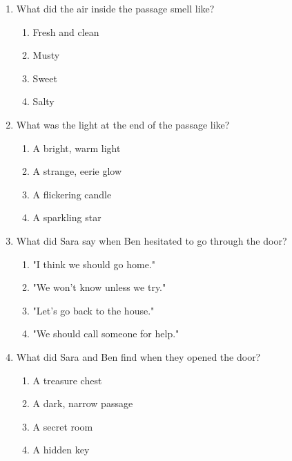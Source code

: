 \documentclass[12pt]{article}
\begin{document}
\begin{enumerate}
    \vspace{0.5cm}

    \item What did the air inside the passage smell like?
    \begin{enumerate}[label=\Alph*.]
        \item Fresh and clean
        \item Musty
        \item Sweet
        \item Salty
    \end{enumerate}

    \vspace{0.5cm}

    \item What was the light at the end of the passage like?
    \begin{enumerate}[label=\Alph*.]
        \item A bright, warm light
        \item A strange, eerie glow
        \item A flickering candle
        \item A sparkling star
    \end{enumerate}

    \vspace{0.5cm}

    \item What did Sara say when Ben hesitated to go through the door?
    \begin{enumerate}[label=\Alph*.]
        \item "I think we should go home."
        \item "We won’t know unless we try."
        \item "Let’s go back to the house."
        \item "We should call someone for help."
    \end{enumerate}

    \vspace{0.5cm}

    \item What did Sara and Ben find when they opened the door?
    \begin{enumerate}[label=\Alph*.]
        \item A treasure chest
        \item A dark, narrow passage
        \item A secret room
        \item A hidden key
    \end{enumerate}


\end{enumerate}
\end{document}
